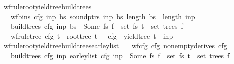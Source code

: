 \begin{isabellebody}
%
\endisadelimproof
%
\isatagproof
%
\endisatagproof
{\isafoldproof}%
%
\isadelimproof
\isanewline
%
\endisadelimproof
{}\isamarkupfalse%
\ wf{\isacharunderscore}{\kern0pt}rule{\isacharunderscore}{\kern0pt}root{\isacharunderscore}{\kern0pt}yield{\isacharunderscore}{\kern0pt}tree{\isacharunderscore}{\kern0pt}build{\isacharunderscore}{\kern0pt}trees{\isacharcolon}{\kern0pt}\isanewline
\ \ \ {\isachardoublequoteopen}wf{\isacharunderscore}{\kern0pt}bins\ cfg\ inp\ bs{\isachardoublequoteclose}\ {\isachardoublequoteopen}sound{\isacharunderscore}{\kern0pt}ptrs\ inp\ bs{\isachardoublequoteclose}\ {\isachardoublequoteopen}length\ bs\ {\isacharequal}{\kern0pt}\ length\ inp\ {\isacharplus}{\kern0pt}\ {}{\isachardoublequoteclose}\isanewline
\ \ \ {\isachardoublequoteopen}build{\isacharunderscore}{\kern0pt}trees\ cfg\ inp\ bs\ {\isacharequal}{\kern0pt}\ Some\ fs{\isachardoublequoteclose}\ {\isachardoublequoteopen}f\ {\isasymin}\ set\ fs{\isachardoublequoteclose}\ {\isachardoublequoteopen}t\ {\isasymin}\ set\ {\isacharparenleft}{\kern0pt}trees\ f{\isacharparenright}{\kern0pt}{\isachardoublequoteclose}\isanewline
\ \ \ {\isachardoublequoteopen}wf{\isacharunderscore}{\kern0pt}rule{\isacharunderscore}{\kern0pt}tree\ cfg\ t\ {\isasymand}\ root{\isacharunderscore}{\kern0pt}tree\ t\ {\isacharequal}{\kern0pt}\ {\isasymSS}\ cfg\ {\isasymand}\ yield{\isacharunderscore}{\kern0pt}tree\ t\ {\isacharequal}{\kern0pt}\ inp{\isachardoublequoteclose}%
\isadelimproof
%
\endisadelimproof
%
\isatagproof
%
\endisatagproof
{\isafoldproof}%
%
\isadelimproof
\isanewline
%
\endisadelimproof
{}\isamarkupfalse%
\ wf{\isacharunderscore}{\kern0pt}rule{\isacharunderscore}{\kern0pt}root{\isacharunderscore}{\kern0pt}yield{\isacharunderscore}{\kern0pt}tree{\isacharunderscore}{\kern0pt}build{\isacharunderscore}{\kern0pt}trees{\isacharunderscore}{\kern0pt}earley{\isacharunderscore}{\kern0pt}list{\isacharcolon}{\kern0pt}\isanewline
\ \ \ {\isachardoublequoteopen}wf{\isacharunderscore}{\kern0pt}cfg\ cfg{\isachardoublequoteclose}\ {\isachardoublequoteopen}nonempty{\isacharunderscore}{\kern0pt}derives\ cfg{\isachardoublequoteclose}\isanewline
\ \ \ {\isachardoublequoteopen}build{\isacharunderscore}{\kern0pt}trees\ cfg\ inp\ {\isacharparenleft}{\kern0pt}earley{\isacharunderscore}{\kern0pt}list\ cfg\ inp{\isacharparenright}{\kern0pt}\ {\isacharequal}{\kern0pt}\ Some\ fs{\isachardoublequoteclose}\ {\isachardoublequoteopen}f\ {\isasymin}\ set\ fs{\isachardoublequoteclose}\ {\isachardoublequoteopen}t\ {\isasymin}\ set\ {\isacharparenleft}{\kern0pt}trees\ f{\isacharparenright}{\kern0pt}{\isachardoublequoteclose}\isanewline

\end{isabellebody}
